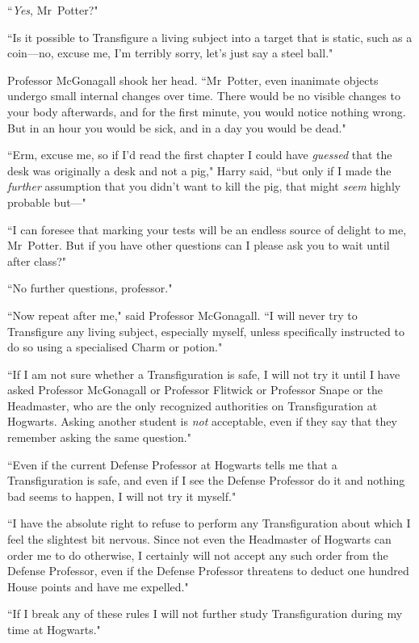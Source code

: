 ``\emph{Yes}, Mr~Potter?"

``Is it possible to Transfigure a living subject into a target that is static, such as a coin—no, excuse me, I'm terribly sorry, let's just say a steel ball."

Professor McGonagall shook her head. ``Mr~Potter, even inanimate objects undergo small internal changes over time. There would be no visible changes to your body afterwards, and for the first minute, you would notice nothing wrong. But in an hour you would be sick, and in a day you would be dead."

``Erm, excuse me, so if I'd read the first chapter I could have \emph{guessed} that the desk was originally a desk and not a pig," Harry said, ``but only if I made the \emph{further} assumption that you didn't want to kill the pig, that might \emph{seem} highly probable but—"

``I can foresee that marking your tests will be an endless source of delight to me, Mr~Potter. But if you have other questions can I please ask you to wait until after class?"

``No further questions, professor."

``Now repeat after me," said Professor McGonagall. ``I will never try to Transfigure any living subject, especially myself, unless specifically instructed to do so using a specialised Charm or potion."

``If I am not sure whether a Transfiguration is safe, I will not try it until I have asked Professor McGonagall or Professor Flitwick or Professor Snape or the Headmaster, who are the only recognized authorities on Transfiguration at Hogwarts. Asking another student is \emph{not} acceptable, even if they say that they remember asking the same question."

``Even if the current Defense Professor at Hogwarts tells me that a Transfiguration is safe, and even if I see the Defense Professor do it and nothing bad seems to happen, I will not try it myself."

``I have the absolute right to refuse to perform any Transfiguration about which I feel the slightest bit nervous. Since not even the Headmaster of Hogwarts can order me to do otherwise, I certainly will not accept any such order from the Defense Professor, even if the Defense Professor threatens to deduct one hundred House points and have me expelled."

``If I break any of these rules I will not further study Transfiguration during my time at Hogwarts."


